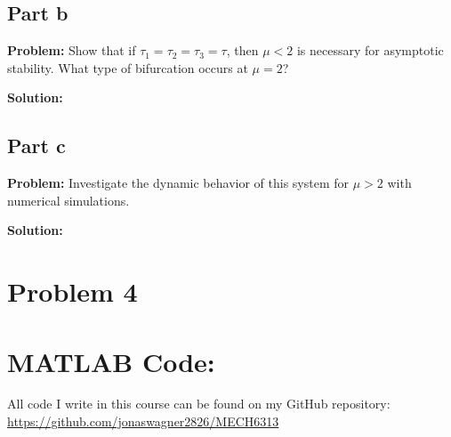 \documentclass[letter]{article}
\begin{document}
\subsection{Part b}
\textbf{Problem:}
Show that if $\tau_1 = \tau_2 = \tau_3 = \tau$, then $\mu <2$ is necessary for asymptotic stability. What type of bifurcation occurs at $\mu = 2$?

\textbf{Solution:}



\subsection{Part c}
\textbf{Problem:}
Investigate the dynamic behavior of this system for $\mu > 2$ with numerical simulations.

\textbf{Solution:}










\newpage
\section{Problem 4}






























\newpage
\appendix
\section{MATLAB Code:}\label{apx:matlab}
All code I write in this course can be found on my GitHub repository:\\
\href{https://github.com/jonaswagner2826/MECH6313}{https://github.com/jonaswagner2826/MECH6313}

\end{document}

